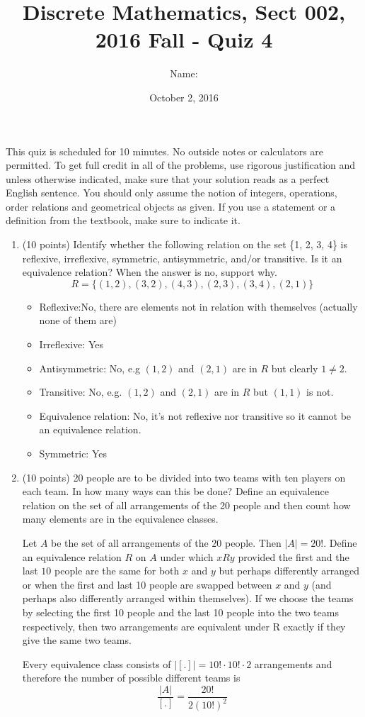 \documentclass[11pt]{preprint}
\title{Discrete Mathematics, Sect 002, 2016 Fall - Quiz 4}
\author{Name:}
\institute{Courant Institute of Mathematical Sciences, NYU}
\date{October 2, 2016}
\begin{document}
\maketitle

This quiz is scheduled for 10 minutes. No outside notes or calculators are permitted. To get full credit  in all of the problems, use rigorous justification and unless otherwise indicated, make sure that your solution reads as a perfect English sentence. You should only assume the notion of integers, operations, order relations and geometrical objects as given. If you use a statement or a definition from the textbook, make sure to indicate it.
\vspace{0.2cm}

\begin{enumerate}
\item(10 points) Identify whether the following relation on the set \{1, 2, 3, 4\} is reflexive,
irreflexive, symmetric, antisymmetric, and/or transitive. Is it an equivalence relation? When the answer is no, support why.
\[
R = \{(1, 2), (3, 2), (4, 3), (2, 3), (3, 4), (2, 1)\}
\]
\begin{itemize}
\item Reflexive:No, there are elements not in relation with themselves (actually none of them are)
\item Irreflexive: Yes
\item Antisymmetric: No, e.g $(1,2)$ and $(2,1)$ are in $R$ but clearly $1\neq 2$.
\item Transitive: No, e.g. $(1,2)$ and $(2,1)$ are in $R$ but $(1,1)$ is not.
\item Equivalence relation: No, it's not reflexive nor transitive so it cannot be an equivalence relation.
\item Symmetric: Yes
\end{itemize}
\vspace{2cm}
\item (10 points) 20 people are to be divided into two teams with ten players on each team. In how many ways can this be done? Define an equivalence relation on the set of all arrangements of the 20 people and then count how many elements are in the equivalence classes.

\vspace{2cm}

Let $A$ be the set of all arrangements of the $20$ people. Then $|A|=20!$. Define an equivalence relation $R$ on $A$ under which $xRy$ provided the first and the last $10$ people are the same for both $x$ and $y$ but perhaps differently arranged or when the first and last 10 people are swapped between $x$ and $y$ (and perhaps also differently arranged within themselves). If we choose the teams by selecting the first 10 people and the last 10 people into the two teams respectively, then two arrangements are equivalent under R exactly if they give the same two teams.

Every equivalence class consists of $|[.]|=10!\cdot 10!\cdot 2$ arrangements and therefore the number of possible different teams is
\[
\frac{|A|}{[.]}=\frac{20!}{2(10!)^2}
\]
\end{enumerate}
\end{document}
